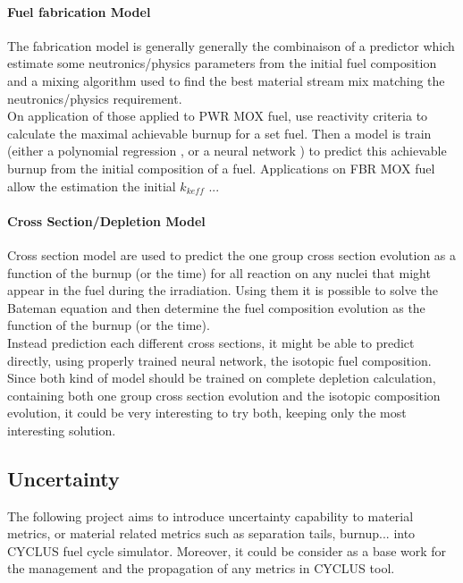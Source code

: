 \documentclass[dvips,12pt]{article}
\begin{document}
\paragraph{Fuel fabrication Model\\}	
The fabrication model is generally generally the combinaison of a predictor which estimate some neutronics/physics parameters from the initial fuel composition and a mixing algorithm used to find the best material stream mix matching the neutronics/physics requirement. \\
On application of those applied to PWR MOX fuel, use reactivity criteria to calculate the maximal achievable burnup for a set fuel.
Then a model is train (either a polynomial regression \cite{Bam_polynomialmodel} , or a neural network \cite{Bal_MLP}) to predict this achievable burnup from the initial composition of a fuel. Applications on FBR MOX fuel allow the estimation the initial $k_{keff}$ \cite{ ?BaL_PHYSOR_2016 ?}...


\paragraph{Cross Section/Depletion Model\\}
Cross section model are used to predict the one group cross section evolution as a function of the burnup (or the time) for all reaction on any nuclei that might appear in the fuel during the irradiation.
Using them it is possible to solve the Bateman equation and then determine the fuel composition evolution as the function of the burnup (or the time).\\
Instead prediction each different cross sections, it might be able to predict directly, using properly trained neural network, the isotopic fuel composition.\\
Since both kind of model should be trained on complete depletion calculation, containing both one group cross section evolution and the isotopic composition evolution, it could be very interesting to try both, keeping only the most interesting solution.



\subsection{Uncertainty}
The following project aims to introduce uncertainty capability to material metrics, or material related metrics such as separation tails, burnup...  into CYCLUS fuel cycle simulator. Moreover, it could be consider as a base work for the management and the propagation of any metrics in CYCLUS tool.
\end{document}
